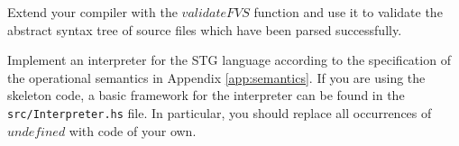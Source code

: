 \documentclass[10pt,a4paper]{exam} %
\begin{document}
\begin{questions}


\question Extend your compiler with the $\mathit{validateFVS}$ function and use it to validate the abstract syntax tree of source files which have been parsed successfully.

\question Implement an interpreter for the STG language according to the specification of the operational semantics in Appendix \ref{app:semantics}. If you are using the skeleton code, a basic framework for the interpreter can be found in the \texttt{src/Interpreter.hs} file. In particular, you should replace all occurrences of $\mathit{undefined}$ with code of your own.


\end{questions}
\end{document}
